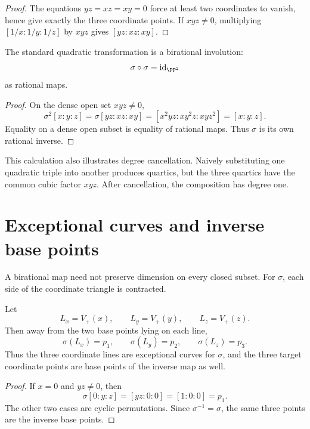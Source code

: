 \begin{proof}
The equations \(yz=xz=xy=0\) force at least two coordinates to vanish, hence give exactly the three coordinate points.  If \(xyz\neq0\), multiplying \([1/x:1/y:1/z]\) by \(xyz\) gives \([yz:xz:xy]\).
\end{proof}

\begin{proposition}\label{prop:vi44-sigma-involution}
The standard quadratic transformation is a birational involution:
\[
  \sigma\circ\sigma=\mathrm{id}_{\PP^2}
\]
as rational maps.
\end{proposition}

\begin{proof}
On the dense open set \(xyz\neq0\),
\[
 \sigma^2[x:y:z]
 =\sigma[yz:xz:xy]
 =[x^2yz:xy^2z:xyz^2]
 =[x:y:z].
\]
Equality on a dense open subset is equality of rational maps.  Thus \(\sigma\) is its own rational inverse.
\end{proof}

This calculation also illustrates degree cancellation.  Naively substituting one quadratic triple into another produces quartics, but the three quartics have the common cubic factor \(xyz\).  After cancellation, the composition has degree one.



\section{Exceptional curves and inverse base points}

A birational map need not preserve dimension on every closed subset.  For \(\sigma\), each side of the coordinate triangle is contracted.

\begin{proposition}\label{prop:vi44-exceptional-lines}
Let
\[
  L_x=V_+(x),\qquad L_y=V_+(y),\qquad L_z=V_+(z).
\]
Then away from the two base points lying on each line,
\[
  \sigma(L_x)=p_1,\qquad
  \sigma(L_y)=p_2,\qquad
  \sigma(L_z)=p_3.
\]
Thus the three coordinate lines are exceptional curves for \(\sigma\), and the three target coordinate points are base points of the inverse map as well.
\end{proposition}

\begin{proof}
If \(x=0\) and \(yz\neq0\), then
\[
  \sigma[0:y:z]=[yz:0:0]=[1:0:0]=p_1.
\]
The other two cases are cyclic permutations.  Since \(\sigma^{-1}=\sigma\), the same three points are the inverse base points.
\end{proof}

